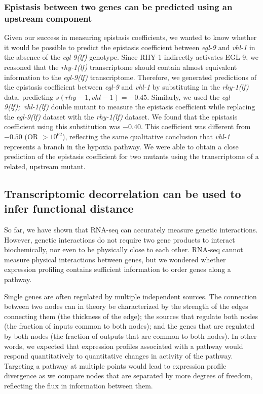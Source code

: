 \documentclass[9pt,twocolumn,twoside]{pnas-new}
\newcommand{\gene}[1]{\mbox{\emph{#1}}}
\newcommand{\egl}{\gene{egl-9(lf)}}
\newcommand{\rhy}{\gene{rhy-1(lf)}}
\newcommand{\eglvhl}{\gene{egl-9(lf); vhl-1(lf)}}
\newcommand{\eglp}{EGL-9}
\newcommand{\rhyp}{RHY-1}
\begin{document}
\color{purple}
\subsubsection*{Epistasis between two genes can be predicted using an upstream component}
\color{black}
Given our success in measuring epistasis coefficients, we wanted to know whether
it would be possible to predict the epistasis coefficient between \gene{egl-9}
and \gene{vhl-1} in the absence of the \egl{} genotype. Since \rhyp{} indirectly
activates \eglp{}, we reasoned that the \rhy{} transcriptome should contain
almost equivalent information to the \egl{} transcriptome. Therefore, we
generated predictions of the epistasis coefficient between \gene{egl-9} and
\gene{vhl-1} by substituting in the \rhy{} data, predicting $s({rhy-1,vhl-1}) =
-0.45$. Similarly, we used the \eglvhl{} double mutant to measure the epistasis
coefficient while replacing the \egl{} dataset with the \rhy{} dataset. We found
that the epistasis coefficient using this substitution was $-0.40$. This
coefficient was different from $-0.50$ (OR $>10^{62}$), reflecting the same
qualitative conclusion that \gene{vhl-1} represents a branch in the hypoxia
pathway. We were able to obtain a close prediction
of the epistasis coefficient for two mutants using the transcriptome of a
related, upstream mutant.

\subsection*{Transcriptomic decorrelation can be used to infer functional distance}
\label{sub:decorrelation}
So far, we have shown that RNA-seq can accurately measure genetic interactions.
However, genetic interactions do not require two gene products to interact
biochemically, nor even to be physically close to each other. RNA-seq cannot
measure physical interactions between genes, but we wondered whether expression
profiling contains sufficient information to order genes along a pathway.

Single genes are often regulated by multiple independent sources. The connection
between two nodes can in theory be characterized by the strength of the edges
connecting them (the thickness of the edge); the sources that regulate both
nodes (the fraction of inputs common to both nodes); and the genes that are
regulated by both nodes (the fraction of outputs that are common to both nodes).
In other words, we expected that expression profiles associated with a pathway
would respond quantitatively to quantitative changes in activity of the pathway.
Targeting a pathway at multiple points would lead to expression profile
divergence as we compare nodes that are separated by more degrees of freedom,
reflecting the flux in information between them.
\end{document}
